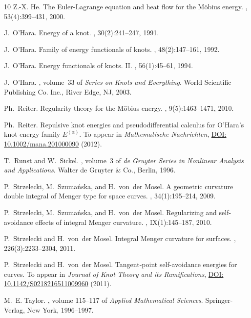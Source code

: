 \documentclass[a4paper,10pt]{article}
\theoremstyle{proof}
\theoremstyle{plain}
\numberwithin{equation}{section}
\begin{document}
\begin{thebibliography}{10}
Z.-X. He.
\newblock The {E}uler-{L}agrange equation and heat flow for the {M}\"obius
  energy.
, 53(4):399--431, 2000.

J.~O'Hara.
\newblock Energy of a knot.
, 30(2):241--247, 1991.

J.~O'Hara.
\newblock Family of energy functionals of knots.
, 48(2):147--161, 1992.

J.~O'Hara.
\newblock Energy functionals of knots. {II}.
, 56(1):45--61, 1994.

J.~O'Hara.
, volume~33 of {\em
  Series on Knots and Everything}.
\newblock World Scientific Publishing Co. Inc., River Edge, NJ, 2003.

{\relax Ph}.~Reiter.
\newblock Regularity theory for the {M}\"obius energy.
, 9(5):1463--1471, 2010.

{\relax Ph}.~Reiter.
\newblock Repulsive knot energies and pseudodifferential calculus for
  {O'Hara}'s knot energy family ${E}^{(\alpha)}$.
\newblock To appear in \emph{Mathematische Nachrichten},
\href{http://dx.doi.org/10.1002/mana.201000090}{DOI: 10.1002/mana.201000090} (2012).

T.~Runst and W.~Sickel.
, volume~3 of {\em de Gruyter Series
  in Nonlinear Analysis and Applications}.
\newblock Walter de Gruyter \& Co., Berlin, 1996.

P.~Strzelecki, M.~Szuma{\'n}ska, and H.~von~der Mosel.
\newblock A geometric curvature double integral of {M}enger type for space
  curves.
, 34(1):195--214, 2009.

P.~Strzelecki, M.~Szuma{\'n}ska, and H.~von~der Mosel.
\newblock Regularizing and self-avoidance effects of integral {M}enger
  curvature.
, IX(1):145--187, 2010.

P.~Strzelecki and H.~von~der Mosel.
\newblock Integral {M}enger curvature for surfaces.
, 226(3):2233--2304, 2011.

P.~Strzelecki and H.~von~der Mosel.
\newblock Tangent-point self-avoidance energies for curves.
\newblock To appear in \emph{Journal of Knot Theory and its
Ramifications}, \href{http://dx.doi.org/10.1142/S0218216511009960}{DOI: 10.1142/S0218216511009960} (2011).

M.~E. Taylor.
, volume 115--117 of
  {\em Applied Mathematical Sciences}.
\newblock Springer-Verlag, New York, 1996--1997.

\end{thebibliography}
\end{document}
